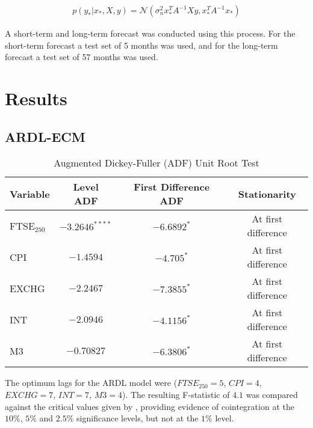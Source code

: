 \documentclass[11pt,a4paper]{article}
\newcommand{\citeboth}[1]{\citeauthor{#1} \citep{#1}}
\begin{document}
\begin{enumerate}
    \begin{align}
        p(y_{*}|x_{*}, X, y) = \mathcal{N}(\sigma_{n}^{2} x_{*}^{T}A^{-1}Xy, x_{*}^{T}A^{-1}x_{*}) \label{eq: testw}
    \end{align}
\end{enumerate}

A short-term and long-term forecast was conducted using this process. For the short-term forecast a test set of 5 months was used, and for the long-term forecast a test set of 57 months was used.


\section{Results}
\label{sec: results}

\subsection{ARDL-ECM}

\begin{table}[h!]
    \centering
    \label{table: unitroot}
    \caption{Augmented Dickey-Fuller (ADF) Unit Root Test}
    \begin{tabular}{lccc}
        \toprule
        \textbf{Variable} & \textbf{Level ADF} & \textbf{First Difference ADF} & \textbf{Stationarity} \\
        \midrule
        FTSE$_{250}$ & $-3.2646^{****}$ & $-6.6892^{*}$ & At first difference \\
        CPI          & $-1.4594$ & $-4.705^{*}$ & At first difference \\
        EXCHG        & $-2.2467$ & $-7.3855^{*}$ & At first difference \\
        INT          & $-2.0946$ & $-4.1156^{*}$ & At first difference \\
        M3           & $-0.70827$ & $-6.3806^{*}$ & At first difference \\
        \bottomrule
    \end{tabular}
\end{table}


The optimum lags for the ARDL model were ($FTSE_{250} = 5$, $CPI = 4$, $EXCHG=7$, $INT =7$, $M3=4$). The resulting F-statistic of $4.1$ was compared against the critical values
given by \citeboth{pesaran2001}, providing evidence of cointegration 
at the $10\%$, $5\%$ and $2.5\%$ significance levels, but not at the $1\%$ 
level.
\end{document}
